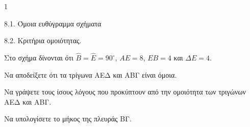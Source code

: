 \begin{ylh}{1}
    \item 8.1. Όμοια ευθύγραμμα σχήματα
    \item 8.2. Κριτήρια ομοιότητας.
\end{ylh}
\begin{figure}
\end{figure}
Στο σχήμα δίνονται ότι $\hat{B} = \hat{E} = 90^\circ$, $AE = 8$, $EB = 4$ και $\Delta E = 4$.
\begin{alist}
\item Να αποδείξετε ότι τα τρίγωνα ΑΕΔ και ΑΒΓ είναι όμοια. 
\item Να γράψετε τους ίσους λόγους που προκύπτουν από την ομοιότητα των τριγώνων ΑΕΔ και ΑΒΓ. 
\item Να υπολογίσετε το μήκος της πλευράς ΒΓ. 
\end{alist}